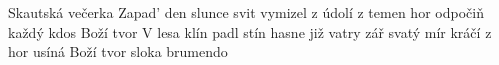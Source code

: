 \begin{TEXT}{Skautská večerka}
\SLOKA Zapad' den \NL
slunce svit vymizel z údolí z temen hor \NL
odpočiň každý kdos Boží tvor 
\SLOKA V lesa klín padl stín \NL
hasne již vatry zář svatý mír kráčí z hor \NL
usíná Boží tvor 
\SLOKA sloka brumendo \NL
\end{TEXT}
